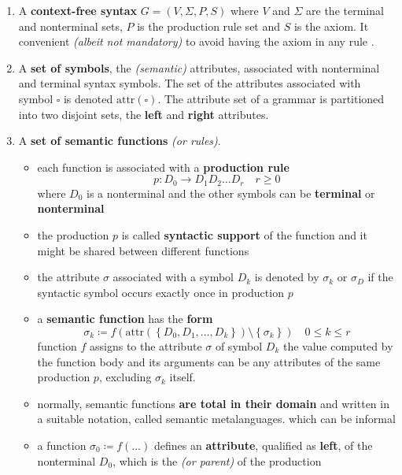 \documentclass[english]{article}
\begin{document}
\begin{definition}
  \begin{enumerate}
    \item A \textbf{context-free syntax} \(G = \left( V, \Sigma, P, S \right)\) where \(V\) and \(\Sigma\) are the terminal and nonterminal sets, \(P\) is the production rule set and \(S\) is the axiom.
          It convenient \textit{(albeit not mandatory)} to avoid having the axiom in any rule \RP.
    \item A \textbf{set of symbols}, the \textit{(semantic)} attributes, associated with nonterminal and terminal syntax symbols.
          The set of the attributes associated with symbol \(\square\) is denoted \(\text{attr}\left( \square \right)\).
          The attribute set of a grammar is partitioned into two disjoint sets, the \textbf{left} and \textbf{right} attributes.
    \item A \textbf{set of semantic functions} \textit{(or rules)}.
          \begin{itemize}
            \item each function is associated with a \textbf{production rule}
                  \[ p: D_0 \rightarrow D_1 D_2 \ldots D_r \quad r \geq 0\]
                  where \(D_0\) is a nonterminal and the other symbols can be \textbf{terminal} or \textbf{nonterminal}
            \item the production \(p\) is called \textbf{syntactic support} of the function and it might be shared between different functions
            \item the attribute \(\sigma\) associated with a symbol \(D_k\) is denoted by \(\sigma_k\) or \(\sigma_D\) if the syntactic symbol occurs exactly once in production \(p\)
            \item a \textbf{semantic function} has the \textbf{form}
                  \[ \sigma_k \coloneqq f \left( \text{attr} \left( \left\{ D_0, D_1, \ldots, D_k \right\} \right) \setminus \left\{ \sigma_k \right\}\right) \quad 0 \leq k \leq r \]
                  function \(f\) assigns to the attribute \(\sigma\) of symbol \(D_k\) the value computed by the function body and its arguments can be any attributes of the same production \(p\), excluding \(\sigma_k\) itself.
            \item normally, semantic functions \textbf{are total in their domain} and written in a suitable notation, called semantic metalanguages. which can be informal
            \item a function \(\sigma_0 \coloneqq f(\ldots)\) defines an \textbf{attribute}, qualified as \textbf{left}, of the nonterminal \(D_0\), which is the \LP \textit{(or parent)} of the production

\end{itemize}
\end{enumerate}
\end{definition}
\end{document}
